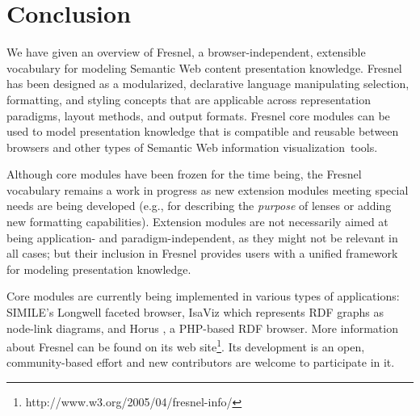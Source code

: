 \section{Conclusion}

We have given an overview of Fresnel, a browser-independent, extensible vocabulary for modeling Semantic Web content presentation knowledge. Fresnel has been designed as a modularized, declarative language manipulating selection, formatting, and styling concepts that are applicable across representation paradigms, layout methods, and output formats. Fresnel core modules can be used to model presentation knowledge that is compatible and reusable between browsers and other types of Semantic Web information visualization~tools.


Although core modules have been frozen for the time being, the Fresnel vocabulary remains a work in progress as new extension modules meeting special needs are being developed (e.g., for describing the {\em purpose} of lenses or adding new formatting capabilities). Extension modules are not necessarily aimed at being application- and paradigm-independent, as they might not be relevant in all cases; but their inclusion in Fresnel provides users with a unified framework for modeling presentation knowledge. 

Core modules are currently being implemented in various types of applications: SIMILE's Longwell \cite{simile} faceted browser, IsaViz \cite{isaviz} which represents RDF graphs as node-link diagrams, and Horus \cite{horus}, a PHP-based RDF browser. More information about Fresnel can be found on its web site\footnote{http://www.w3.org/2005/04/fresnel-info/}. Its development is an open, community-based effort and new contributors are welcome to participate in it.

